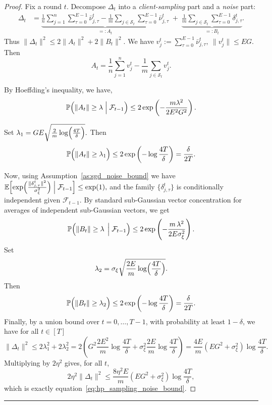 \documentclass{article} %
\def\eqref#1{equation~\ref{#1}}
\begin{document}
\begin{proof}
Fix a round $t$. Decompose $\Delta_t$ into a \emph{client-sampling} part and a \emph{noise} part:
\[
\begin{aligned}
\Delta_t
&=
\underbrace{
\frac{1}{n} \sum_{j=1}^n \sum_{\tau=0}^{E-1} \bar{\nu}_{j,\tau}^t
-
\frac{1}{m} \sum_{j\in \mathcal{S}_t}  \sum_{\tau=0}^{E-1} \bar{\nu}_{j,\tau}^t
}_{=:A_t}
\;+\;
\underbrace{
\frac{1}{m}\sum_{j\in\mathcal{S}_t}\sum_{\tau=0}^{E-1} \delta_{j,\tau}^t
}_{=:B_t}.
\end{aligned}
\]
Thus
$
\|\Delta_t\|^2 \le 2\|A_t\|^2 + 2\|B_t\|^2.
$
We have
$
v_j^t := \sum_{\tau=0}^{E-1} \bar{\nu}_{j,\tau}^t, \ \|v_j^t\|\le EG.
$
Then
\[
A_t
=
\frac{1}{n}\sum_{j=1}^n v_j^t
-
\frac{1}{m}\sum_{j\in\mathcal{S}_t} v_j^t.
\]

By Hoeffding's inequality, we have,
\[
\mathbb{P}\Bigl( \|A_t\| \ge \lambda \Bigm|\mathcal{F}_{t-1}\Bigr)\le
2\exp \left(-\frac{m \lambda^2}{2E^2 G^2}\right).
\]

Set $\lambda_1 = GE\sqrt{\frac{2}{m}\log\Bigl(\frac{4T}{\delta}\Bigr)}.$
Then
\[
\mathbb{P}\Bigl( \|A_t\| \ge \lambda_1 \Bigr)
\le
2\exp \left(-\log\frac{4T}{\delta}\right)
=
\frac{\delta}{2T}.
\]

Now, using Assumption~\ref{as:sgd_noise_bound} we have $
\mathbb{E}\Bigl[
\exp\Bigl(\frac{\|\delta_{j,\tau}^t\|^2}{\sigma_\xi^2}\Bigr)
\Bigm|\mathcal{F}_{t-1}
\Bigr]\le \exp(1),
$ and the family $\{\delta_{j,\tau}^t\}$ is conditionally independent given $\mathcal{F}_{t-1}$.
By standard sub-Gaussian vector concentration for averages of independent sub-Gaussian vectors, we get
$$
\mathbb{P}\Bigl( \|B_t\| \ge \lambda \,\Bigm| \mathcal{F}_{t-1}\Bigr)
\le
2\exp \left(-\frac{m\,\lambda^2}{2E \sigma_\xi^2}\right).
$$
Set
\[
\lambda_2
=
\sigma_\xi\sqrt{\frac{2E}{m}\log\Bigl(\frac{4T}{\delta}\Bigr)}.
\]
Then
\[
\mathbb{P}\Bigl( \|B_t\| \ge \lambda_2 \Bigr)
\le
2\exp\left(-\log\frac{4T}{\delta}\right)
=
\frac{\delta}{2T}.
\]
Finally, by a union bound over $t=0,\dots,T-1$, with probability at least $1-\delta$, we have  for all $t \in [T]$
\[
\|\Delta_t\|^2
\le 2\lambda_1^2  + 2\lambda_2^2 
= 2\left(
G^2\frac{2E^2}{m}\log\frac{4T}{\delta}
+
\sigma_\xi^2\frac{2E}{m}\log\frac{4T}{\delta}
\right)
=
\frac{4E}{m}(EG^2+\sigma_\xi^2)\log\frac{4T}{\delta}.
\]
Multiplying by $2\eta^2$ gives, for all $t$,
\[
2\eta^2\|\Delta_t\|^2
\le
\frac{8\eta^2E}{m}(EG^2+\sigma_\xi^2)\log\frac{4T}{\delta},
\]
which is exactly \eqref{eq:hp_sampling_noise_bound}.
\end{proof}
\hrule
\end{document}
